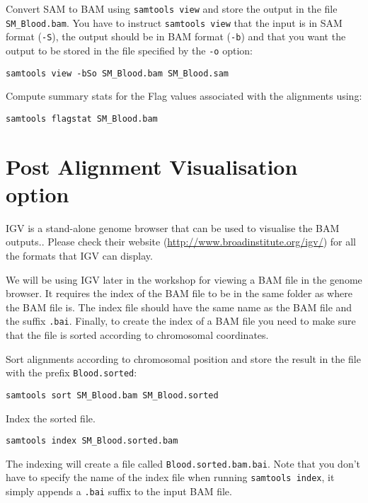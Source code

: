 \begin{steps}
Convert SAM to BAM using \texttt{samtools view} and store the output in the file
\texttt{SM\_Blood.bam}. You have to instruct \texttt{samtools view} that the input is in SAM
format (\texttt{-S}), the output should be in BAM format (\texttt{-b}) and that
you want the output to be stored in the file specified by the \texttt{-o}
option:

\begin{lstlisting}
samtools view -bSo SM_Blood.bam SM_Blood.sam
\end{lstlisting}
\end{steps}

\begin{advanced}
Compute summary stats for the Flag values associated with the alignments using:

\begin{lstlisting}
samtools flagstat SM_Blood.bam
\end{lstlisting}
\end{advanced}

\section{Post Alignment Visualisation option}

\begin{information}
IGV is a stand-alone genome browser that can be used to visualise the BAM outputs.. Please check their website
(\url{http://www.broadinstitute.org/igv/}) for all the formats that IGV can display.
 
We will be using IGV later in the workshop for viewing a BAM file in the genome browser. It requires the index of the BAM file to be in the same folder as where the BAM file is. The index file should have the same name as the BAM file and the suffix \texttt{.bai}. Finally, to create the index of a BAM file you need to make sure that the file is sorted
according to chromosomal coordinates.
\begin{note}
\end{note}

\end{information}


\begin{steps}
Sort alignments according to chromosomal position and store the result in the
file with the prefix \texttt{Blood.sorted}:

\begin{lstlisting}
samtools sort SM_Blood.bam SM_Blood.sorted
\end{lstlisting}

Index the sorted file.

\begin{lstlisting}
samtools index SM_Blood.sorted.bam
\end{lstlisting}

The indexing will create a file called \texttt{Blood.sorted.bam.bai}. Note that
you don't have to specify the name of the index file when running
\texttt{samtools index}, it simply appends a \texttt{.bai} suffix to the input
BAM file.
\end{steps}


